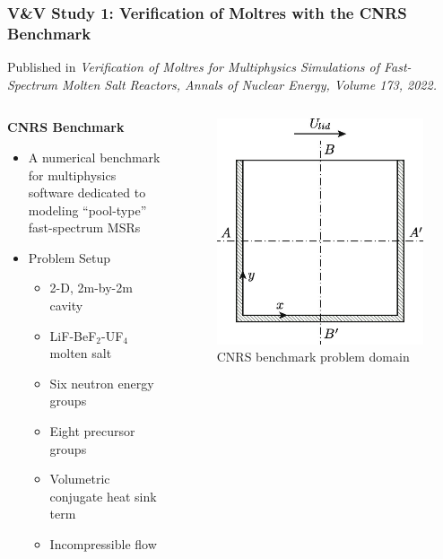 \begin{frame}
  \frametitle{V\&V Study 1: Verification of Moltres with the CNRS Benchmark}

  Published in \textit{Verification of Moltres for Multiphysics Simulations of Fast-Spectrum Molten
    Salt Reactors, Annals of Nuclear Energy, Volume 173, 2022.}

  \begin{columns}
    \column[t]{6.5cm}
    \begin{block}{\textbf{CNRS Benchmark \cite{tiberga_results_2020}}}
      \begin{itemize}
        \item A numerical benchmark for multiphysics software dedicated to modeling ``pool-type''
          fast-spectrum MSRs
        \item Problem Setup
          \begin{itemize}
            \item 2-D, 2m-by-2m cavity
            \item LiF-BeF$_2$-UF$_4$ molten salt
            \item Six neutron energy groups
            \item Eight precursor groups
            \item Volumetric conjugate heat sink term
            \item Incompressible flow
          \end{itemize}
      \end{itemize}
    \end{block}
    \column[t]{3.5cm}
    \begin{figure}
      \centering
      \includegraphics[width=\columnwidth]{../images/cnrs-geometry}
      \caption{CNRS benchmark problem domain \cite{tiberga_results_2020}}
    \end{figure}
  \end{columns}
\end{frame}

